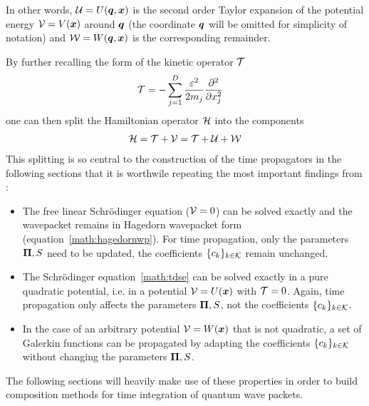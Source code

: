 %
In other words, $\mathcal{U} = U(\bm{q},\bm{x})$ is the second order Taylor expansion of the potential energy $\mathcal{V} = V(\bm{x})$ around $\bm{q}$ (the coordinate $\bm{q}$ will be omitted for simplicity of notation) and $\mathcal{W} = W(\bm{q},\bm{x})$ is the corresponding remainder.
\par\medskip
%
By further recalling the form of the kinetic operator $\mathcal{T}$
\begin{align}
	\mathcal{T} &= - \sum_{j=1}^D \frac{\varepsilon^2}{2m_j} \frac{\partial^2}{\partial x_j^2}
\end{align}
%
one can then split the Hamiltonian operator $\mathcal{H}$ into the components
%
\begin{align}
	\mathcal{H} = \mathcal{T} + \mathcal{V} = \mathcal{T} + \mathcal{U} + \mathcal{W}
\end{align}
%
This splitting is so central to the construction of the time propagators in the following sections that it is worthwile repeating the most important findings from \cite{FGL_semiclassical_dynamics}:
\begin{itemize}
	\item The free linear Schrödinger equation ($\mathcal{V}=0$) can be solved exactly and the wavepacket remains in Hagedorn wavepacket form (equation~\ref{math:hagedornwp}).
		For time propagation, only the parameters $\bm{\Pi},S$ need to be updated, the coefficients $\{c_k\}_{k \in \mathcal{K}}$ remain unchanged.
	\item The Schrödinger equation~\ref{math:tdse} can be solved exactly in a pure quadratic potential, i.e. in a potential $\mathcal{V}=U(\bm{x})$ with $\mathcal{T}=0$.
		Again, time propagation only affects the parameters $\bm{\Pi},S$, not the coefficients $\{c_k\}_{k \in \mathcal{K}}$.
	\item In the case of an arbitrary potential $\mathcal{V} = W(\bm{x})$ that is not quadratic, a set of Galerkin functions can be propagated by adapting the coefficients $\{c_k\}_{k \in \mathcal{K}}$ without changing the parameters $\bm{\Pi},S$.
\end{itemize}
%
The following sections will heavily make use of these properties in order to build composition methods for time integration of quantum wave packets.

